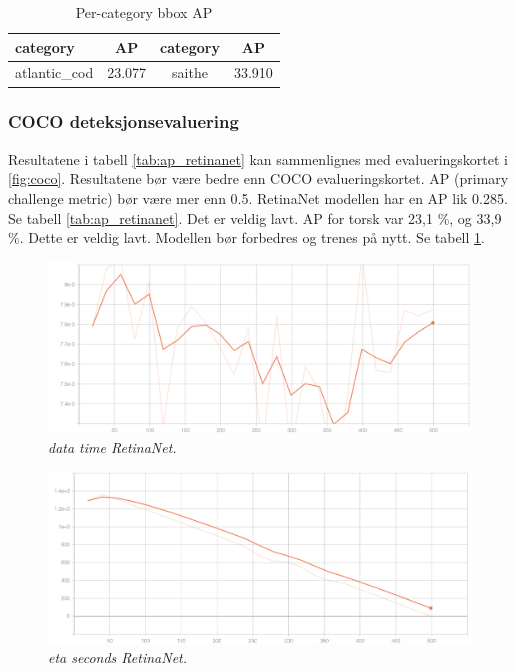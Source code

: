 \begin{table}[]
\bigskip
\centering
\label{tab:per-category_bbox_retinanet} 
\caption{Per-category bbox AP} 
\begin{tabular}[t]{lccc}
\toprule
 category     & AP     & category   & AP      \\
 \midrule
 atlantic\_cod & 23.077 & saithe     & 33.910 \\
 \bottomrule	
\end{tabular}
\end{table}

\subsubsection{COCO deteksjonsevaluering} 

Resultatene i tabell \ref{tab:ap_retinanet} kan sammenlignes med evalueringskortet i \ref{fig:coco}. Resultatene bør være bedre enn COCO evalueringskortet. AP (primary challenge metric) bør være mer enn 0.5. RetinaNet modellen har en AP lik 0.285. Se tabell \ref{tab:ap_retinanet}. Det er veldig lavt. AP for torsk var 23,1 \%, og 33,9 \%. Dette er veldig lavt. Modellen bør forbedres og trenes på nytt. Se tabell \ref{tab:per-category_bbox_retinanet}.

\begin{figure}[h!]
\begin{center} 
\includegraphics[scale=0.35]{figures/data_time_retinanet_1}
\caption{\small \sl data time RetinaNet. \label{fig:data_time_retinanet}}
\end{center}
\end{figure}

\begin{figure}[h!]
\begin{center} 
\includegraphics[scale=0.35]{figures/eta_seconds_retinanet_2}
\caption{\small \sl eta seconds RetinaNet. \label{fig:eta_seconds_retinanet}}
\end{center}
\end{figure}

